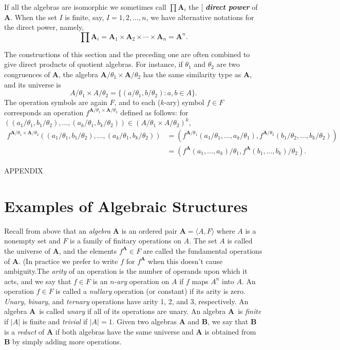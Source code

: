 \documentclass[12pt]{article}
\theoremstyle{plain}
\theoremstyle{definition}
\theoremstyle{remark}
\theoremstyle{remark}
\numberwithin{theorem}{section}
\numberwithin{equation}{section}
\newcommand{\<}{\ensuremath{\langle}}
\renewcommand{\>}{\ensuremath{\rangle}}
\newcommand{\bA}{\ensuremath{\mathbf{A}}}
\newcommand{\bB}{\ensuremath{\mathbf{B}}}
\newcommand{\indexit}[1]{\index{#1|textit}}
\def\defn#1{\gdef\defnstring{#1}%
  \xdef\dodefnii{{\noexpand\bfseries\noexpand\em
       \defnstring}\noexpand\indexit{\defnstring}\noexpand\makeatother}%
  \futurelet\nextthing\dodefn}
\def\dodefn{%
  \ifx\nextthing[\let\next=\dodefni
    \else\let\next=\dodefnii\fi
  \makeatletter
  \next}
\def\dodefni[#1]{%
  {\bfseries\em\defnstring}%
  \indexit{#1}%
  \makeatother}
\begin{document}
If all the algebras are isomorphic %
we sometimes call 
$\prod \bA_i$ the \defn{direct power} of $\bA$.  When the set $I$ is
finite, say, $I = {1, 2, \dots, n}$,
we have alternative notations for the direct power, namely,
\[
\prod \bA_i = \bA_1 \times \bA_2 \times \cdots \times \bA_n = \bA^n.
\]

The constructions of this section and the preceding one
are often combined to give direct products of quotient algebras.  For instance, if
$\theta_1$ and $\theta_2$ are two congruences of $\bA$, the algebra 
$\bA/\theta_1\times \bA/\theta_2$ has the same similarity type as $\bA$, and its
universe is
\[
A/\theta_1\times A/\theta_2 = \{
(a/\theta_1, b/\theta_2) : a, b \in A\}.
\]
The operation symbols are again $F$, and to each ($k$-ary) symbol $f\in F$
corresponds an operation $f^{\bA/\theta_1\times \bA/\theta_2}$ defined as follows:
 for $((a_1/\theta_1, b_1/\theta_2), \dots, (a_k/\theta_1, b_k/\theta_2)) \in 
(A/\theta_1\times A/\theta_2)^k$,
 \begin{align*}
f^{\bA/\theta_1\times \bA/\theta_2}
((a_1/\theta_1, b_1/\theta_2), \dots, (a_k/\theta_1, b_k/\theta_2))
&=
(f^{\bA/\theta_1}
(a_1/\theta_1, \dots, a_k/\theta_1),
f^{\bA/\theta_2}
(b_1/\theta_2, \dots, b_k/\theta_2))\\
&=
(f^{\bA}(a_1, \dots, a_k)/\theta_1,
 f^{\bA}(b_1, \dots, b_k)/\theta_2). %
 \end{align*}


\appendix                       

\begin{center}
  APPENDIX
\end{center}


\section{Examples of Algebraic Structures}
\label{sec:exampl-algebr-struct}
Recall from above that an \emph{algebra}
$\bA$ is an ordered pair $\bA = \langle A, F\rangle$ 
where $A$ is a nonempty set and $F$ is a family of finitary operations on $A$.
The set $A$ is called the universe of \bA, and the elements $f^{\bA} \in F$ are 
called the fundamental operations of $\bA$. (In practice we prefer to 
write $f$ for $f^{\bA}$ when this doesn't cause
ambiguity.The \emph{arity} of an operation is the number of operands upon which it
acts, and we say that $f\in F$ is an $n$-\emph{ary} operation on
$A$ if $f$ maps $A^n$ into $A$.
An operation $f\in F$ is called a \emph{nullary} operation (or constant) 
if its arity is zero.  \emph{Unary}, \emph{binary}, and \emph{ternary} 
operations have arity 1, 2, and 3, respectively.  An algebra \bA\ is called 
\emph{unary} if all of its operations are unary.  An algebra \bA\ 
is \emph{finite} if $|A|$ is finite and \emph{trivial} if $|A| = 1$.
Given two algebras $\bA$ and $\bB$, we say that $\bB$ is a 
\emph{reduct} of $\bA$ if both algebras have the same universe and $\bA$
is obtained from $\bB$ by simply adding more operations.
\end{document}
